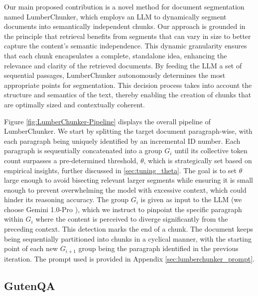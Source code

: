 Our main proposed contribution is a novel method for document segmentation named LumberChunker, which employs an LLM to dynamically segment documents into semantically independent chunks. Our approach is grounded in the principle that retrieval benefits from segments that can vary in size to better capture the content's semantic independence. This dynamic granularity ensures that each chunk encapsulates a complete, standalone idea, enhancing the relevance and clarity of the retrieved documents. By feeding the LLM a set of sequential passages, LumberChunker autonomously determines the most appropriate points for segmentation. This decision process takes into account the structure and semantics of the text, thereby enabling the creation of chunks that are optimally sized and contextually coherent.
\par
Figure \ref{fig:LumberChunker-Pipeline} displays the overall pipeline of LumberChunker. We start by splitting the target document paragraph-wise, with each paragraph being uniquely identified by an incremental ID number. Each paragraph is sequentially concatenated into a group $G_i$ until its collective token count surpasses a pre-determined threshold, \( \theta \), which is strategically set based on empirical insights, further discussed in \ref{sec:tuning_theta}. The goal is to set $\theta$ large enough to avoid bisecting relevant larger segments while ensuring it is small enough to prevent overwhelming the model with excessive context, which could hinder its reasoning accuracy. The group $G_i$ is given as input to the LLM (we choose Gemini 1.0-Pro \cite{gemini_1.0}), which we instruct to pinpoint the specific paragraph within \( G_i \) where the content is perceived to diverge significantly from the preceding context. This detection marks the end of a chunk. The document keeps being sequentially partitioned into chunks in a cyclical manner, with the starting point of each new \( G_{i+1} \) group being the paragraph identified in the previous iteration. The prompt used is provided in Appendix \ref{sec:lumberchunker_prompt}.

\subsection{GutenQA}

